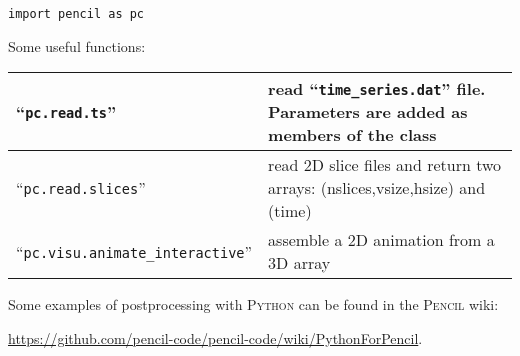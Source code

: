 \documentclass[a4paper,12pt]{article}
\newcommand{\file}[1]{``\texttt{#1}''}
\newcommand{\name}[1]{\textsc{#1}}
\begin{document}
\begin{verbatim}
import pencil as pc
\end{verbatim}

Some useful functions:
\begin{center}
\begin{tabular}{|l|l|}\hline
\file{pc.read.ts} & read \file{time\_series.dat} file. Parameters are added as 
members of the class\\\hline
\file{pc.read.slices} & read 2D slice files and return two arrays: 
(nslices,vsize,hsize) and (time)\\\hline
\file{pc.visu.animate\_interactive} & assemble a 2D animation from a 3D 
array\\\hline
\end{tabular}
\end{center}

Some examples of postprocessing with \name{Python} can be found in the 
\name{Pencil} wiki:


\url{https://github.com/pencil-code/pencil-code/wiki/PythonForPencil}.

% 
\end{document}

